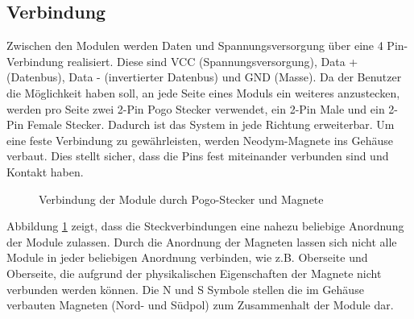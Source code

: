 \subsection{Verbindung}
Zwischen den Modulen werden Daten und Spannungsversorgung über eine 4 Pin-Verbindung realisiert. Diese sind VCC (Spannungsversorgung), Data + (Datenbus), Data - (invertierter Datenbus) und GND (Masse). Da der Benutzer die Möglichkeit haben soll, an jede Seite eines Moduls ein weiteres anzustecken, werden pro Seite zwei 2-Pin Pogo Stecker verwendet, ein 2-Pin Male und ein 2-Pin Female Stecker. Dadurch ist das System in jede Richtung erweiterbar. Um eine feste Verbindung zu gewährleisten,  werden Neodym-Magnete ins Gehäuse verbaut. Dies stellt sicher, dass die Pins fest miteinander verbunden sind und Kontakt haben. 
\begin{figure}[H]
    \centering    
    \caption{Verbindung der Module durch Pogo-Stecker und Magnete}
    \label{pogo_verbindung}
\end{figure}
 \noindent Abbildung \ref{pogo_verbindung} zeigt, dass die Steckverbindungen eine nahezu beliebige Anordnung der Module zulassen. Durch die Anordnung der Magneten lassen sich nicht alle Module in jeder beliebigen Anordnung verbinden, wie z.B. Oberseite und Oberseite, die aufgrund der physikalischen Eigenschaften der Magnete nicht verbunden werden können. Die \glqq N\grqq{} und \glqq S\grqq{} Symbole stellen die im Gehäuse verbauten Magneten (Nord- und Südpol) zum Zusammenhalt der Module dar.
 
